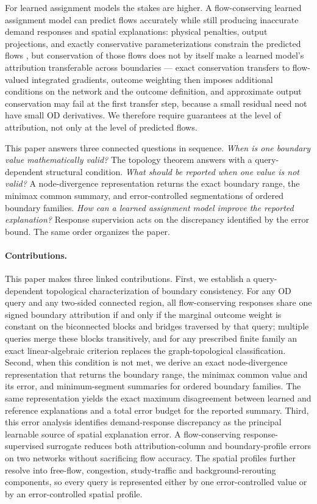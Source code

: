 \documentclass[a4paper,fleqn]{cas-sc}
\begin{document}
For learned assignment models the stakes are higher. A flow-conserving
learned assignment model can predict flows accurately while still
producing inaccurate demand responses and spatial explanations: physical
penalties, output projections, and exactly conservative parameterizations
constrain the predicted flows
\citep{raissi2019physics,shi2021physics,valente2025physics,richterpowell2022neural},
but conservation of those flows does not by itself make a learned
model's attribution transferable across boundaries --- exact
conservation transfers to flow-valued integrated gradients, outcome
weighting then imposes additional conditions on the network and the
outcome definition, and approximate output conservation may fail at
the first transfer step, because a small residual need not have small
OD derivatives. We therefore require guarantees at the level of
attribution, not only at the level of predicted flows.

This paper answers three connected questions in sequence. \emph{When is
one boundary value mathematically valid?} The topology theorem answers
with a query-dependent structural condition. \emph{What should be
reported when one value is not valid?} A node-divergence representation
returns the exact boundary range, the minimax common summary, and
error-controlled segmentations of ordered boundary families. \emph{How
can a learned assignment model improve the reported explanation?}
Response supervision acts on the discrepancy identified by the error
bound. The same order organizes the paper.

\paragraph{Contributions.}
This paper makes three linked contributions. First, we establish a
query-dependent topological characterization of boundary consistency.
For any OD query and any two-sided connected region, all
flow-conserving responses share one signed boundary attribution if and
only if the marginal outcome weight is constant on the biconnected
blocks and bridges traversed by that query; multiple queries merge
these blocks transitively, and for any prescribed finite family an
exact linear-algebraic criterion replaces the graph-topological
classification. Second, when this condition is not met, we derive an
exact node-divergence representation that returns the boundary range,
the minimax common value and its error, and minimum-segment summaries
for ordered boundary families. The same representation yields the exact
maximum disagreement between learned and reference explanations and a
total error budget for the reported summary. Third, this error analysis
identifies demand-response discrepancy as the principal learnable
source of spatial explanation error. A flow-conserving
response-supervised surrogate reduces both attribution-column and
boundary-profile errors on two networks without sacrificing flow
accuracy. The spatial profiles further resolve into free-flow,
congestion, study-traffic and background-rerouting components, so every
query is represented either by one error-controlled value or by an
error-controlled spatial profile.
\end{document}
